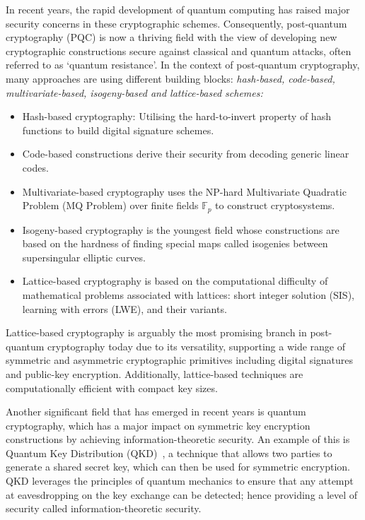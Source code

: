 \documentclass[cryptography,review,submit,pdftex,moreauthors,amsmath,amssymb,aps,strict]{Definitions/mdpi}
\begin{document}
In recent years, the rapid development of quantum computing has raised major security concerns in these cryptographic schemes. Consequently, post-quantum cryptography (PQC) is now a thriving field with the view of developing new cryptographic constructions secure against classical and quantum attacks, often referred to as `quantum resistance'. In the context of post-quantum cryptography, many approaches are using different building blocks: \textit{hash-based, code-based, multivariate-based, isogeny-based and lattice-based schemes:}
\begin{itemize}
    \item Hash-based cryptography: Utilising the hard-to-invert property of hash functions to build digital signature schemes.
    \item Code-based constructions derive their security from decoding generic linear codes.
    \item Multivariate-based cryptography uses the NP-hard Multivariate Quadratic Problem (MQ Problem) over finite fields $\mathbb{F}_p$ to construct cryptosystems.
    \item Isogeny-based cryptography is the youngest field whose constructions are based on the hardness of finding special maps called isogenies between supersingular elliptic curves.
    \item Lattice-based cryptography is based on the computational difficulty of mathematical problems associated with lattices: short integer solution (SIS), learning with errors (LWE), and their variants.
\end{itemize}

Lattice-based cryptography is arguably the most promising branch in post-quantum cryptography today due to its versatility, supporting a wide range of symmetric and asymmetric cryptographic primitives including digital signatures and public-key encryption. Additionally, lattice-based techniques are computationally efficient with compact key sizes.

Another significant field that has emerged in recent years is quantum cryptography, which has a major impact on symmetric key encryption constructions by achieving information-theoretic security. An example of this is Quantum Key Distribution (QKD)~\cite{BB84,E91}, a technique that allows two parties to generate a shared secret key, which can then be used for symmetric encryption. QKD leverages the principles of quantum mechanics to ensure that any attempt at eavesdropping on the key exchange can be detected; hence providing a level of security called information-theoretic security.
\end{document}
